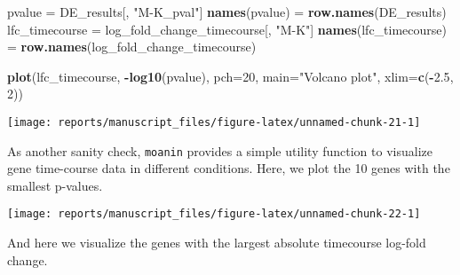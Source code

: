 \documentclass[9pt,a4paper,]{extarticle}
\newenvironment{Shaded}{\begin{snugshade}}{\end{snugshade}}
\newcommand{\DataTypeTok}[1]{\textcolor[rgb]{0.13,0.29,0.53}{#1}}
\newcommand{\DecValTok}[1]{\textcolor[rgb]{0.00,0.00,0.81}{#1}}
\newcommand{\FloatTok}[1]{\textcolor[rgb]{0.00,0.00,0.81}{#1}}
\newcommand{\KeywordTok}[1]{\textcolor[rgb]{0.13,0.29,0.53}{\textbf{#1}}}
\newcommand{\NormalTok}[1]{#1}
\newcommand{\OperatorTok}[1]{\textcolor[rgb]{0.81,0.36,0.00}{\textbf{#1}}}
\newcommand{\OtherTok}[1]{\textcolor[rgb]{0.56,0.35,0.01}{#1}}
\newcommand{\StringTok}[1]{\textcolor[rgb]{0.31,0.60,0.02}{#1}}
\begin{document}
\begin{Shaded}
\begin{Highlighting}[]
\NormalTok{pvalue =}\StringTok{ }\NormalTok{DE_results[, }\StringTok{"M-K_pval"}\NormalTok{]}
\KeywordTok{names}\NormalTok{(pvalue) =}\StringTok{ }\KeywordTok{row.names}\NormalTok{(DE_results)}
\NormalTok{lfc_timecourse =}\StringTok{ }\NormalTok{log_fold_change_timecourse[, }\StringTok{"M-K"}\NormalTok{]}
\KeywordTok{names}\NormalTok{(lfc_timecourse) =}\StringTok{ }\KeywordTok{row.names}\NormalTok{(log_fold_change_timecourse)}

\KeywordTok{plot}\NormalTok{(lfc_timecourse, }\OperatorTok{-}\KeywordTok{log10}\NormalTok{(pvalue), }\DataTypeTok{pch=}\DecValTok{20}\NormalTok{, }\DataTypeTok{main=}\StringTok{"Volcano plot"}\NormalTok{,}
     \DataTypeTok{xlim=}\KeywordTok{c}\NormalTok{(}\OperatorTok{-}\FloatTok{2.5}\NormalTok{, }\DecValTok{2}\NormalTok{))}
\end{Highlighting}
\end{Shaded}

\begin{center}\texttt{[image: reports/manuscript\_files/figure-latex/unnamed-chunk-21-1]} \end{center}

As another sanity check, \texttt{moanin} provides a simple utility function to
visualize gene time-course data in different conditions. Here, we plot the 10
genes with the smallest p-values.

\begin{Shaded}
\end{Shaded}

\begin{center}\texttt{[image: reports/manuscript\_files/figure-latex/unnamed-chunk-22-1]} \end{center}

And here we visualize the genes with the largest absolute timecourse log-fold
change.
\end{document}

